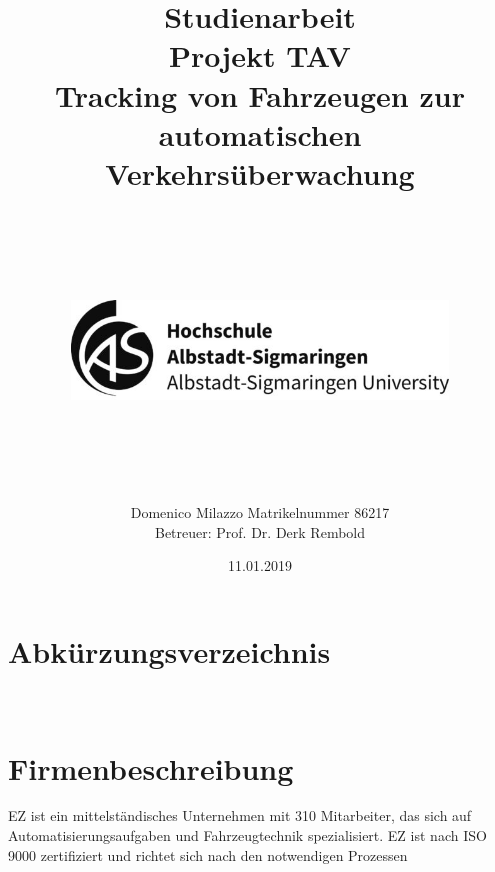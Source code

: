 \documentclass[a4paper,10pt]{scrartcl}
\begin{document}
\title{Studienarbeit \vspace{50px} \hfill \\  Projekt TAV  \hfill \\  \vspace{50px} 
Tracking von Fahrzeugen zur automatischen Verkehrsüberwachung \hfill \\ \hfill \\
\hfill \\ 
\begin{center}
\includegraphics[width=10cm]{picture/hs_albsig_logo}
\end{center}
\hfill \\  \vspace{50px}
}


\author{Domenico Milazzo Matrikelnummer 86217 \hfill \\ Betreuer: Prof. Dr. Derk Rembold}
\date{11.01.2019}
\maketitle
\clearpage
\setcounter{page}{1}
\tableofcontents
\clearpage

\newpage

\section{Abkürzungsverzeichnis}
\hfill \\
\begin{acronym}[Bash]
\end{acronym}

\section{Firmenbeschreibung}
EZ ist ein mittelständisches Unternehmen mit 310 Mitarbeiter, das sich auf Automatisierungsaufgaben und Fahrzeugtechnik spezialisiert. EZ ist nach ISO 9000 zertifiziert und richtet sich nach den notwendigen Prozessen
\end{document}
